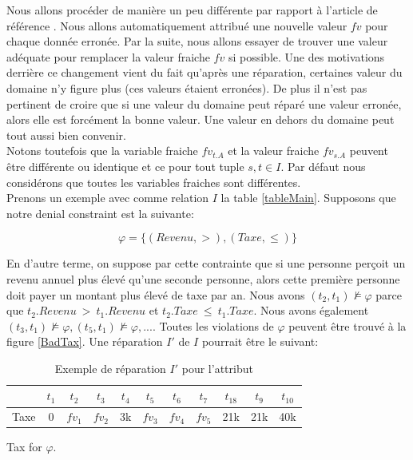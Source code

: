 \documentclass[letterpaper, 12pt]{report}
\theoremstyle{definition}
\begin{document}
Nous allons procéder de manière un peu différente par rapport à l'article de référence \cite{main}. Nous allons automatiquement attribué une nouvelle valeur $fv$ pour chaque donnée erronée. Par la suite, nous allons essayer de trouver une valeur adéquate pour remplacer la valeur fraiche $fv$ si possible. Une des motivations derrière ce changement vient du fait qu'après une réparation, certaines valeur du domaine n'y figure plus (ces valeurs étaient erronées). De plus il n'est pas pertinent de croire que si une valeur du domaine peut réparé une valeur erronée, alors elle est forcément la bonne valeur. Une valeur en dehors du domaine peut tout aussi bien convenir.\\

Notons toutefois que la variable fraiche $fv_{t.A}$ et la valeur fraiche $fv_{s.A}$ peuvent être différente ou identique et ce pour tout tuple $s,t \in I$. Par défaut nous considérons que toutes les variables fraiches sont différentes.\\

Prenons un exemple avec comme relation $I$ la table \ref{tableMain}. Supposons que notre denial constraint est la suivante:

$$ \varphi = \{(Revenu,>),(Taxe,\leq)\}$$

En d'autre terme, on suppose par cette contrainte que si une personne perçoit un revenu annuel plus élevé qu'une seconde personne, alors cette première personne doit payer un montant plus élevé de taxe par an. Nous avons $(t_2,t_1) \not\models \varphi$ parce que $t_2.Revenu\ >\ t_1.Revenu$ et $t_2.Taxe\ \leq\ t_1.Taxe$. Nous avons également $(t_3,t_1) \not\models \varphi,(t_5,t_1) \not\models \varphi,...$. Toutes les violations de $\varphi$ peuvent être trouvé à la figure \ref{BadTax}. Une réparation $I'$ de $I$ pourrait être le suivant:


\begin{table}[H]
	\centering
	\begin{tabular}{|c|c c c c c c c c c c|}
	\hline
	   & $t_1$ & $t_2$ & $t_3$ &$t_4$ &$t_5$ &$t_6$ &$t_7$ &$t_18$ &$t_9$ &$t_10$ \\
	\hline
	 Taxe & 0 & \color{red} $fv_1$ & \color{red} $fv_2$& 3k & \color{orange}$fv_3$& \color{orange} $fv_4$& \color{orange} $fv_5$& 21k & 21k & 40k\\
	 \hline
	\end{tabular}
	\caption{\label{tableExample} Exemple de réparation $I'$ pour l'attribut} 
	Tax for $\varphi$.
\end{table}
\end{document}

